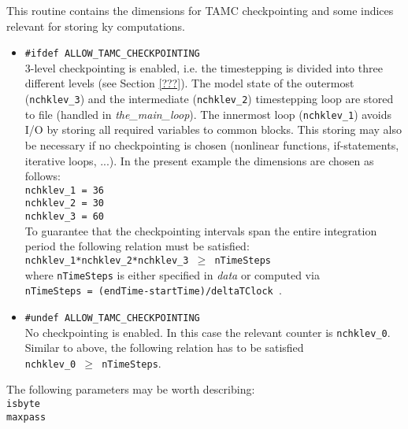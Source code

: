 This routine contains the dimensions for TAMC checkpointing
and some indices relevant for storing ky computations.
%
\begin{itemize}
%
\item {\tt \#ifdef ALLOW\_TAMC\_CHECKPOINTING} \\
3-level checkpointing is enabled, i.e. the timestepping
is divided into three different levels (see Section \ref{???}).
The model state of the outermost ({\tt nchklev\_3}) and the
intermediate ({\tt nchklev\_2}) timestepping loop are stored to file
(handled in {\it the\_main\_loop}).
The innermost loop ({\tt nchklev\_1}) 
avoids I/O by storing all required variables
to common blocks. This storing may also be necessary if
no checkpointing is chosen
(nonlinear functions, if-statements, iterative loops, ...).
In the present example the dimensions are chosen as follows: \\
\hspace*{4ex} {\tt nchklev\_1      =  36 } \\
\hspace*{4ex} {\tt nchklev\_2      =  30 } \\
\hspace*{4ex} {\tt nchklev\_3      =  60 } \\
To guarantee that the checkpointing intervals span the entire
integration period the following relation must be satisfied: \\
\hspace*{4ex} {\tt nchklev\_1*nchklev\_2*nchklev\_3 $ \ge $ nTimeSteps} \\
where {\tt nTimeSteps} is either specified in {\it data}
or computed via \\
\hspace*{4ex} {\tt nTimeSteps = (endTime-startTime)/deltaTClock }. 
%
\item {\tt \#undef ALLOW\_TAMC\_CHECKPOINTING} \\
No checkpointing is enabled.
In this case the relevant counter is {\tt nchklev\_0}.
Similar to above, the following relation has to be satisfied \\
\hspace*{4ex} {\tt nchklev\_0 $ \ge $ nTimeSteps}.
%
\end{itemize}

The following parameters may be worth describing: \\
%
\hspace*{4ex} {\tt isbyte} \\
\hspace*{4ex} {\tt maxpass} \\
~
 
